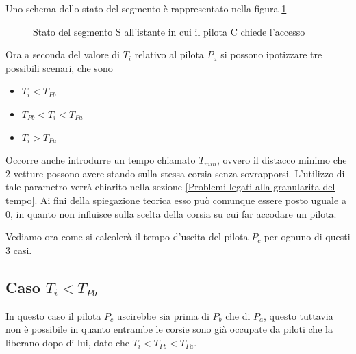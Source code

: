 \documentclass[a4paper,11pt, twoside, openright]{book}
\begin{document}
      Uno schema dello stato del segmento è rappresentato nella figura \ref{fgr:AccessoSegmentiStatoInziale}
      
      \begin{figure}[ht]
	\centering
	\caption{Stato del segmento S all'istante in cui il pilota C chiede l'accesso}
	\label{fgr:AccessoSegmentiStatoInziale}
      \end{figure}
      
      Ora a seconda del valore di $T_i$ relativo al pilota $P_a$ si possono ipotizzare tre possibili scenari, che sono
      
      \begin{itemize}
	\item $T_i < T_{Pb}$
	\item $T_{Pb} < T_i < T_{Pa}$
	\item $T_i > T_{Pa}$
      \end{itemize}
      
      Occorre anche introdurre un tempo chiamato $T_{min}$, ovvero il distacco minimo che 2 vetture possono avere
      stando sulla stessa corsia senza sovrapporsi. L'utilizzo di tale parametro verrà chiarito nella sezione
      \ref{Problemi legati alla granularita del tempo}. Ai fini della spiegazione teorica esso può
      comunque essere posto uguale a $0$,
      in quanto non influisce sulla scelta della corsia su cui far accodare un pilota.
      
      Vediamo ora come si calcolerà il tempo d'uscita del pilota $P_c$ per ognuno di questi 3 casi.
      
      \subsection{Caso $T_i < T_{Pb}$}
	In questo caso il pilota $P_c$ uscirebbe sia prima di $P_b$ che di $P_a$, questo tuttavia non è possibile in quanto
	entrambe le corsie sono già occupate da piloti che la liberano dopo di lui, dato che $T_i < T_{Pb} < T_{Pa}$.
	
\end{document}
